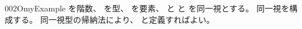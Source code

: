 \documentclass[index]{subfiles}
\begin{document}
\begin{myBlock}{002O}{myExample}
  を階数、
  を型、
  を要素、
  と
  と
  を同一視とする。
  同一視を構成する。
  同一視型の帰納法により、
  と定義すればよい。
\end{myBlock}
\end{document}

